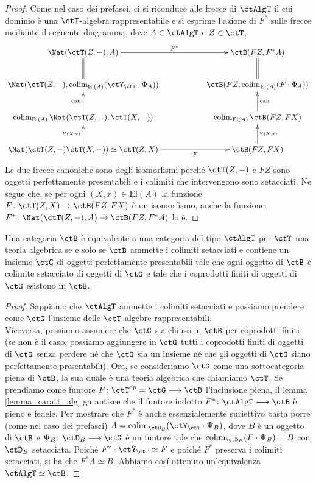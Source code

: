 \begin{proof}
 Come nel caso dei prefasci, ci si riconduce alle frecce di \(\ctAlgT\) il cui dominio è una \(\ctT\)-algebra rappresentabile
 e si esprime l'azione di \(F^*\) sulle frecce mediante il seguente diagramma, dove \(A \in \ctAlgT\) e \(Z \in \ctT\),
 \[\xymatrix{ \Nat(\ctT(Z,-), A) \ar[rr]^-{F^*} \ar@{=}[d] & & \ctB(FZ, F^*A) \ar@{=}[d] \\
  \Nat(\ctT(Z,-), \colim_{\mathrm{El}(A)}(\ctY_{\ctT} \cmp \Phi_A)) & & \ctB(FZ, \colim_{\mathrm{El}(A)}(F \cmp \Phi_A)) \\
  \colim_{\mathrm{El}(A)}\Nat(\ctT(Z,-),\ctT(X,-)) \ar[u]^{\mathrm{can}} & & \colim_{\mathrm{El}(A)}\ctB(FZ,FX) \ar[u]_{\mathrm{can}} \\
  \Nat(\ctT(Z,-)\ctT(X,-)) \simeq \ctT(Z,X) \ar[rr]_-{F} \ar[u]^{\sigma_{(X,x)}} & & \ctB(FZ,FX) \ar[u]_{\sigma_{(X,x)}} }\]
 Le due frecce canoniche sono degli isomorfismi perché \(\ctT(Z,-)\) e \(FZ\) sono oggetti perfettamente presentabili e i colimiti che
 intervengono sono setacciati. Ne segue che, se per ogni \((X,x) \in \mathrm{El}(A)\) la funzione \(F \colon \ctT(Z,X) \to \ctB(FZ,FX)\)
 è un isomorfismo, anche la funzione \(F^* \colon \Nat(\ctT(Z,-),A) \to \ctB(FZ,F^*A)\) lo è.
\end{proof}

\begin{proposition}\label{prop_caratt_alg}
 Una categoria \(\ctB\) è equivalente a una categoria del tipo \(\ctAlgT\) per \(\ctT\) una teoria algebrica se e solo se
 \(\ctB\) ammette i colimiti setacciati e contiene un insieme \(\ctG\) di oggetti perfettamente presentabili tale che ogni oggetto di
 \(\ctB\) è colimite setacciato di oggetti di \(\ctG\) e tale che i coprodotti finiti di oggetti di \(\ctG\) esistono in \(\ctB\).
\end{proposition}

\begin{proof}
 Sappiamo che \(\ctAlgT\) ammette i colimiti setacciati e possiamo prendere come \(\ctG\) l'insieme delle \(\ctT\)-algebre
 rappresentabili. \\
 Viceversa, possiamo assumere che \(\ctG\) sia chiuso in \(\ctB\) per coprodotti finiti (se non è il caso, possiamo aggiungere
 in \(\ctG\) tutti i coprodotti finiti di oggetti di \(\ctG\) senza perdere né che \(\ctG\) sia un insieme né che gli oggetti di \(\ctG\)
 siano perfettamente presentabili). Ora, se consideriamo \(\ctG\) come una sottocategoria piena di \(\ctB\), la sua duale
 è una teoria algebrica che chiamiamo \(\ctT\). Se prendiamo come funtore \(F \colon \ctT^{\op} = \ctG \fun \ctB\)
 l'inclusione piena, il lemma \ref{lemma_caratt_alg} garantisce che il funtore indotto \(F^* \colon \ctAlgT \fun \ctB\) è pieno e
 fedele. Per mostrare che \(F^*\) è anche essenzialemente suriettivo basta porre (come nel caso dei prefasci)
 \(A = \colim_{\ctD_B}(\ctY_{\ctT} \cmp \Psi_B)\), dove \(B\) è un oggetto di \(\ctB\) e \(\Psi_B \colon \ctD_B \fun \ctG\)
 è un funtore tale che \(\colim_{\ctD_B}(F \cmp \Psi_B) = B\) con \(\ctD_B\) setacciata. Poiché \(F^* \cmp \ctY_{\ctT} \simeq F\)
 e poiché \(F^*\) preserva i colimiti setacciati, si ha che \(F^*A \simeq B\). Abbiamo cos\'i ottenuto un'equivalenza \(\ctAlgT \simeq \ctB\).
\end{proof}

